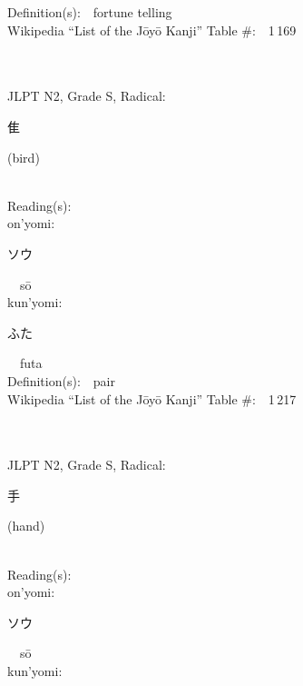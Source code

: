 \begin{multicols}{2}
Definition(s):\ \ fortune telling \\
Wikipedia ``List of the J\=oy\=o Kanji'' Table \#:\ \ 1\,169 \\
\ \ \\
{\fontsize{34pt}{40pt}  }\ \ \\  %
{JLPT N2, Grade S, Radical:\ \ {\begin{CJK}{UTF8}{min} 隹 \end{CJK}} (bird) } \\
Reading(s):\ \ \\
{\hspace*{1em}}on'yomi:\ \ \\
{\hspace*{2em}}{\begin{CJK}{UTF8}{min} ソウ \end{CJK}}\ \ s\=o\ \ \\
{\hspace*{1em}}kun'yomi:\ \ \\
{\hspace*{2em}}{\begin{CJK}{UTF8}{min} ふた \end{CJK}}\ \ futa\ \ \\
Definition(s):\ \ pair \\
Wikipedia ``List of the J\=oy\=o Kanji'' Table \#:\ \ 1\,217 \\
\ \ \\
{\fontsize{34pt}{40pt}  }\ \ \\  %
{JLPT N2, Grade S, Radical:\ \ {\begin{CJK}{UTF8}{min} 手 \end{CJK}} (hand) } \\
Reading(s):\ \ \\
{\hspace*{1em}}on'yomi:\ \ \\
{\hspace*{2em}}{\begin{CJK}{UTF8}{min} ソウ \end{CJK}}\ \ s\=o\ \ \\
{\hspace*{1em}}kun'yomi:\ \ \\

\end{multicols}
